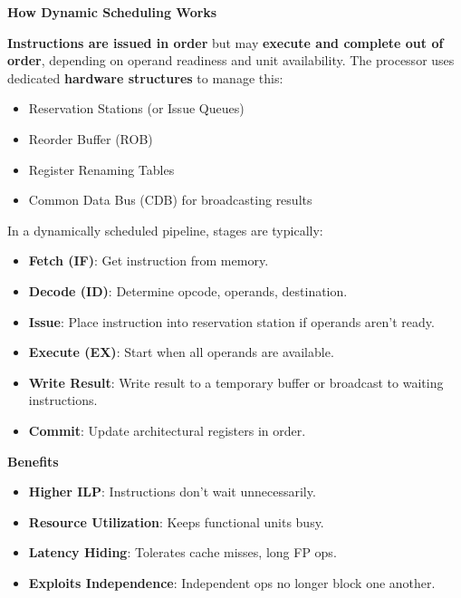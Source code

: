 \highspace
\begin{flushleft}
    \textcolor{Green3}{ \textbf{How Dynamic Scheduling Works}}
\end{flushleft}
\textbf{Instructions are issued in order} but may \textbf{execute and complete out of order}, depending on operand readiness and unit availability. The processor uses dedicated \textbf{hardware structures} to manage this:
\begin{itemize}
    \item Reservation Stations (or Issue Queues)
    \item Reorder Buffer (ROB)
    \item Register Renaming Tables
    \item Common Data Bus (CDB) for broadcasting results
\end{itemize}
In a dynamically scheduled pipeline, stages are typically:
\begin{itemize}
    \item \textbf{Fetch (IF)}: Get instruction from memory.
    \item \textbf{Decode (ID)}: Determine opcode, operands, destination.
    \item \textbf{Issue}: Place instruction into reservation station if operands aren't ready.
    \item \textbf{Execute (EX)}: Start when all operands are available.
    \item \textbf{Write Result}: Write result to a temporary buffer or broadcast to waiting instructions.
    \item \textbf{Commit}: Update architectural registers in order.
\end{itemize}

\highspace
\begin{flushleft}
    \textcolor{Green3}{ \textbf{Benefits}}
\end{flushleft}
\begin{itemize}[label=\textcolor{Green3}{}]
    \item \textbf{Higher ILP}: Instructions don't wait unnecessarily.
    \item \textbf{Resource Utilization}: Keeps functional units busy.
    \item \textbf{Latency Hiding}: Tolerates cache misses, long FP ops.
    \item \textbf{Exploits Independence}: Independent ops no longer block one another.
\end{itemize}

